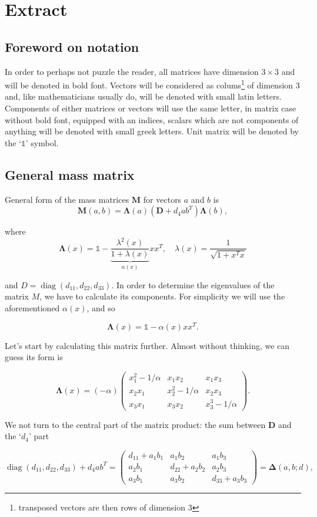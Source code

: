 \documentclass[12pt, a4paper]{article}
\newcommand{\diag}{
	\operatorname{diag}
}
\renewcommand{\ni}{
	\noindent
}
\newcommand{\M}{
	\ensuremath{\mathbf{M}}
}
\renewcommand{\L}{
	\ensuremath{\mathbf{\Lambda}}
}
\newcommand{\D}{
	\ensuremath{\mathbf{D}}
}
\newcommand{\De}{
	\ensuremath{\mathbf{\Delta}}
}
\newcommand{\I}{
	\ensuremath{\mathds{1}}
}
\begin{document}
\section{Extract}

\subsection{Foreword on notation}
In order to perhaps not puzzle the reader, all matrices have dimension $3 \times 3$ and will be denoted in bold font. Vectors
will be considered as colums\footnote{transposed vectors are then rows of dimension 3} of dimension $3$ and, like
mathematicians usually do, will be denoted with small latin letters. Components of either matrices or vectors will use the
same letter, in matrix case without bold font, equipped with an indices, scalars which are not components of anything will
be denoted with small greek letters. Unit matrix will be denoted by the `$\I$' symbol.

\subsection{General mass matrix}
General form of the mass matrices $\M$ for vectors $a$ and $b$ is
\[
	\M (a,b) = \L(a)(\D + d_4 ab^T)\L(b),
\]

\ni where 
\[
	\L(x) = \I - \underbrace{\frac{\lambda^2(x)}{1 + \lambda(x)}}_{\alpha(x)} xx^T, \quad \lambda(x) =
		\frac{1}{\sqrt{1 + x^Tx}}
\]

\ni and $D = \diag (d_{11}, d_{22}, d_{33})$. In order to determine the eigenvalues of the matrix $M$, we have to calculate its
components. For simplicity we will use the aforementioned $\alpha(x)$, and so

\[
	\L(x) = \I - \alpha (x) xx^T.
\]

Let's start by calculating this matrix further. Almost without thinking, we can guess its form is

\[
	\L(x) = (-\alpha) \begin{pmatrix}
		x_1^2 - 1/\alpha & x_1 x_2 & x_1 x_3 \\
		x_2 x_1 & x_2^2 - 1/\alpha & x_2 x_3 \\
		x_3 x_1 & x_3 x_2 & x_3^3 - 1/\alpha
		\end{pmatrix}.
\]

\ni We not turn to the central part of the matrix product: the sum between $\D$ and the `$d_4$' part

\[
	\diag(d_{11}, d_{22}, d_{33}) + d_4 ab^T = \begin{pmatrix}
		d_{11} + a_1 b_1 & a_1 b_2 & a_1 b_3 \\
		a_2 b_1 & d_{22} + a_2 b_2 & a_2 b_3 \\
		a_3 b_1 & a_3 b_2 & d_{33} + a_3 b_3
	\end{pmatrix} = \De(a,b; d),
\]
\end{document}
